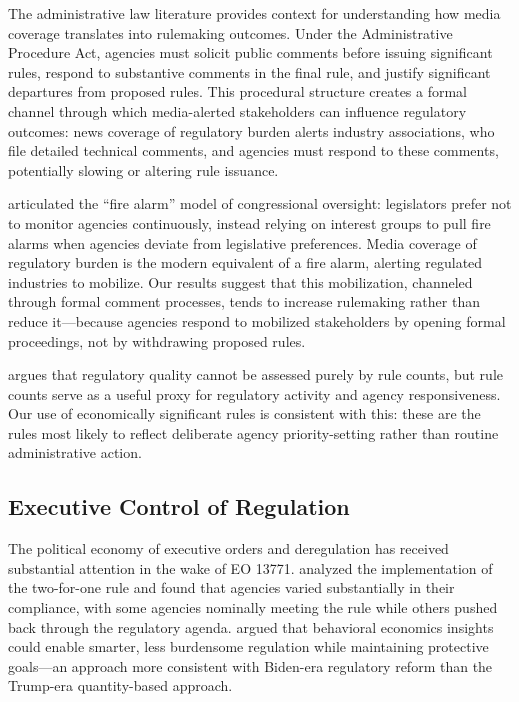 \documentclass[12pt]{article}
\begin{document}
The administrative law literature provides context for understanding how media coverage translates into rulemaking outcomes. Under the Administrative Procedure Act, agencies must solicit public comments before issuing significant rules, respond to substantive comments in the final rule, and justify significant departures from proposed rules. This procedural structure creates a formal channel through which media-alerted stakeholders can influence regulatory outcomes: news coverage of regulatory burden alerts industry associations, who file detailed technical comments, and agencies must respond to these comments, potentially slowing or altering rule issuance.

\citet{mccubbins1984police} articulated the ``fire alarm'' model of congressional oversight: legislators prefer not to monitor agencies continuously, instead relying on interest groups to pull fire alarms when agencies deviate from legislative preferences. Media coverage of regulatory burden is the modern equivalent of a fire alarm, alerting regulated industries to mobilize. Our results suggest that this mobilization, channeled through formal comment processes, tends to increase rulemaking rather than reduce it---because agencies respond to mobilized stakeholders by opening formal proceedings, not by withdrawing proposed rules.

\citet{coglianese2012measuring} argues that regulatory quality cannot be assessed purely by rule counts, but rule counts serve as a useful proxy for regulatory activity and agency responsiveness. Our use of economically significant rules is consistent with this: these are the rules most likely to reflect deliberate agency priority-setting rather than routine administrative action.

\subsection{Executive Control of Regulation}

The political economy of executive orders and deregulation has received substantial attention in the wake of EO 13771. \citet{rai2020deregulation} analyzed the implementation of the two-for-one rule and found that agencies varied substantially in their compliance, with some agencies nominally meeting the rule while others pushed back through the regulatory agenda. \citet{sunstein2014simpler} argued that behavioral economics insights could enable smarter, less burdensome regulation while maintaining protective goals---an approach more consistent with Biden-era regulatory reform than the Trump-era quantity-based approach.
\end{document}
